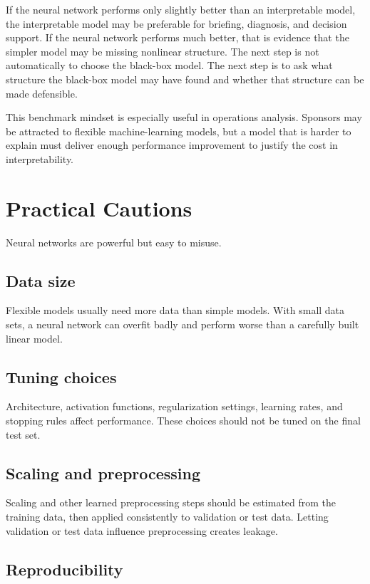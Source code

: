 If the neural network performs only slightly better than an interpretable model, the interpretable model may be preferable for briefing, diagnosis, and decision support.  If the neural network performs much better, that is evidence that the simpler model may be missing nonlinear structure.  The next step is not automatically to choose the black-box model.  The next step is to ask what structure the black-box model may have found and whether that structure can be made defensible.

This benchmark mindset is especially useful in operations analysis.  Sponsors may be attracted to flexible machine-learning models, but a model that is harder to explain must deliver enough performance improvement to justify the cost in interpretability.

\section{Practical Cautions}

Neural networks are powerful but easy to misuse.

\subsection*{Data size}

Flexible models usually need more data than simple models.  With small data sets, a neural network can overfit badly and perform worse than a carefully built linear model.

\subsection*{Tuning choices}

Architecture, activation functions, regularization settings, learning rates, and stopping rules affect performance.  These choices should not be tuned on the final test set.

\subsection*{Scaling and preprocessing}

Scaling and other learned preprocessing steps should be estimated from the training data, then applied consistently to validation or test data.  Letting validation or test data influence preprocessing creates leakage.

\subsection*{Reproducibility}

